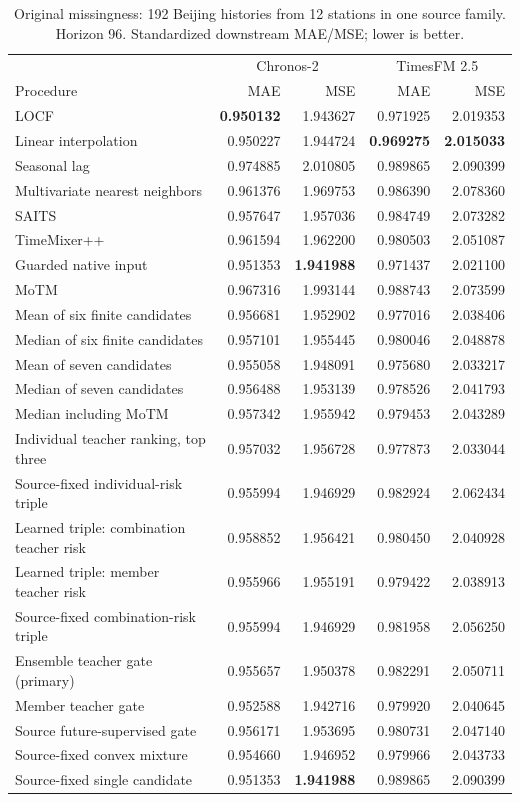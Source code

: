 \begin{table}[!htbp]
\caption{Original missingness: 192 Beijing histories from 12 stations in one source family. Horizon 96. Standardized downstream MAE/MSE; lower is better.}
\label{tab:r6_all_native_h96}
\centering\small
\begin{tabular}{lrrrr}
\toprule
 & \multicolumn{2}{c}{Chronos-2} & \multicolumn{2}{c}{TimesFM 2.5}\\
Procedure & MAE & MSE & MAE & MSE\\
\midrule
LOCF & \textbf{0.950132} & 1.943627 & 0.971925 & 2.019353\\
Linear interpolation & 0.950227 & 1.944724 & \textbf{0.969275} & \textbf{2.015033}\\
Seasonal lag & 0.974885 & 2.010805 & 0.989865 & 2.090399\\
Multivariate nearest neighbors & 0.961376 & 1.969753 & 0.986390 & 2.078360\\
SAITS & 0.957647 & 1.957036 & 0.984749 & 2.073282\\
TimeMixer++ & 0.961594 & 1.962200 & 0.980503 & 2.051087\\
Guarded native input & 0.951353 & \textbf{1.941988} & 0.971437 & 2.021100\\
MoTM & 0.967316 & 1.993144 & 0.988743 & 2.073599\\
Mean of six finite candidates & 0.956681 & 1.952902 & 0.977016 & 2.038406\\
Median of six finite candidates & 0.957101 & 1.955445 & 0.980046 & 2.048878\\
Mean of seven candidates & 0.955058 & 1.948091 & 0.975680 & 2.033217\\
Median of seven candidates & 0.956488 & 1.953139 & 0.978526 & 2.041793\\
Median including MoTM & 0.957342 & 1.955942 & 0.979453 & 2.043289\\
Individual teacher ranking, top three & 0.957032 & 1.956728 & 0.977873 & 2.033044\\
Source-fixed individual-risk triple & 0.955994 & 1.946929 & 0.982924 & 2.062434\\
Learned triple: combination teacher risk & 0.958852 & 1.956421 & 0.980450 & 2.040928\\
Learned triple: member teacher risk & 0.955966 & 1.955191 & 0.979422 & 2.038913\\
Source-fixed combination-risk triple & 0.955994 & 1.946929 & 0.981958 & 2.056250\\
Ensemble teacher gate (primary) & 0.955657 & 1.950378 & 0.982291 & 2.050711\\
Member teacher gate & 0.952588 & 1.942716 & 0.979920 & 2.040645\\
Source future-supervised gate & 0.956171 & 1.953695 & 0.980731 & 2.047140\\
Source-fixed convex mixture & 0.954660 & 1.946952 & 0.979966 & 2.043733\\
Source-fixed single candidate & 0.951353 & \textbf{1.941988} & 0.989865 & 2.090399\\
\bottomrule
\end{tabular}
\end{table}


